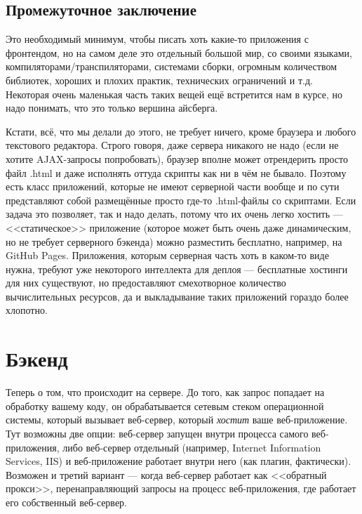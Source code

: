 \documentclass[a5paper]{article}
\begin{document}
\subsection{Промежуточное заключение}

Это необходимый минимум, чтобы писать хоть какие-то приложения с фронтендом, но на самом деле это отдельный большой мир, со своими языками, компиляторами/транспиляторами, системами сборки, огромным количеством библиотек, хороших и плохих практик, технических ограничений и т.д. Некоторая очень маленькая часть таких вещей ещё встретится нам в курсе, но надо понимать, что это только вершина айсберга.

Кстати, всё, что мы делали до этого, не требует ничего, кроме браузера и любого текстового редактора. Строго говоря, даже сервера никакого не надо (если не хотите AJAX-запросы попробовать), браузер вполне может отрендерить просто файл .html и даже исполнять оттуда скрипты как ни в чём не бывало. Поэтому есть класс приложений, которые не имеют серверной части вообще и по сути представляют собой размещённые просто где-то .html-файлы со скриптами. Если задача это позволяет, так и надо делать, потому что их очень легко хостить --- <<статическое>> приложение (которое может быть очень даже динамическим, но не требует серверного бэкенда) можно разместить бесплатно, например, на GitHub Pages. Приложения, которым серверная часть хоть в каком-то виде нужна, требуют уже некоторого интеллекта для деплоя --- бесплатные хостинги для них существуют, но предоставляют смехотворное количество вычислительных ресурсов, да и выкладывание таких приложений гораздо более хлопотно.

\section{Бэкенд}

Теперь о том, что происходит на сервере. До того, как запрос попадает на обработку вашему коду, он обрабатывается сетевым стеком операционной системы, который вызывает веб-сервер, который \emph{хостит} ваше веб-приложение. Тут возможны две опции: веб-сервер запущен внутри процесса самого веб-приложения, либо веб-сервер отдельный (например, Internet Information Services, IIS) и веб-приложение работает внутри него (как плагин, фактически). Возможен и третий вариант --- когда веб-сервер работает как <<обратный прокси>>, перенаправляющий запросы на процесс веб-приложения, где работает его собственный веб-сервер.
\end{document}
